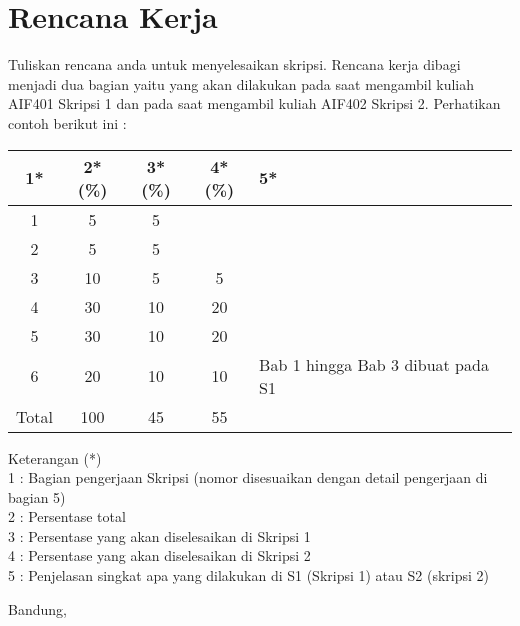 \documentclass[a4paper,twoside]{article}
\begin{document}
\section{Rencana Kerja}
Tuliskan rencana anda untuk menyelesaikan skripsi. Rencana kerja dibagi menjadi dua bagian yaitu yang akan dilakukan pada saat mengambil kuliah AIF401 Skripsi 1 dan pada saat mengambil kuliah AIF402 Skripsi 2. Perhatikan contoh berikut ini :


\begin{center}
  \begin{tabular}{ | c | c | c | c | l |}
    \hline
    1*  & 2*(\%) & 3*(\%) & 4*(\%) &5*\\ \hline \hline
    1   & 5  & 5  &  &  \\ \hline
    2   & 5 & 5  &   & \\ \hline
    3	& 10 & 5 & 5 & \\ \hline
    4	& 30 & 10  & 20  & \\ \hline
    5   & 30  & 10  & 20 & \\ \hline
    6   & 20  &  10 &  10 & {\footnotesize Bab 1 hingga Bab 3 dibuat pada S1} \\ \hline
    Total  & 100  & 45  & 55 &  \\ \hline
                          \end{tabular}
\end{center}

Keterangan (*)\\
1 : Bagian pengerjaan Skripsi (nomor disesuaikan dengan detail pengerjaan di bagian 5)\\
2 : Persentase total \\
3 : Persentase yang akan diselesaikan di Skripsi 1 \\
4 : Persentase yang akan diselesaikan di Skripsi 2 \\
5 : Penjelasan singkat apa yang dilakukan di S1 (Skripsi 1) atau S2 (skripsi 2)

\vspace{1cm}
\centering Bandung, \tanggal\\
\vspace{2cm} \nama \\ 
\vspace{1cm}
\end{document}
